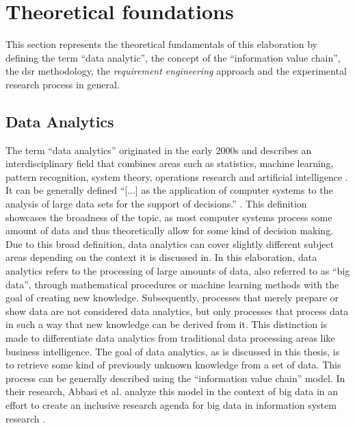 \newpage\section{Theoretical foundations}

This section represents the theoretical fundamentals of this elaboration by defining the term \enquote{data analytic}, the concept of the \enquote{information value chain}, the \ac{dsr} methodology, the \textit{requirement engineering} approach and the experimental research process in general.


\subsection{Data Analytics}

The term \enquote{data analytics} originated in the early 2000s and describes an interdisciplinary field that combines areas such as statistics, machine learning, pattern recognition, system theory, operations research and artificial intelligence \parencite{Runkler.2020}. It can be generally defined \enquote{[...] as the application of computer systems to the analysis of large data sets for the support of decisions.} \parencite{Runkler.2020}. This definition showcases the broadness of the topic, as most computer systems process some amount of data and thus theoretically allow for some kind of decision making. Due to this broad definition, data analytics can cover slightly different subject areas depending on the context it is discussed in. In this elaboration, data analytics refers to the processing of large amounts of data, also referred  to as \enquote{big data}, through mathematical procedures or machine learning methods with the goal of creating new knowledge. Subsequently, processes that merely prepare or show data are not considered data analytics, but only processes that process data in such a way that new knowledge can be derived from it. This distinction is made to differentiate data analytics from traditional data processing areas like business intelligence. The goal of data analytics, as is discussed in this thesis, is to retrieve some kind of previously unknown knowledge from a set of data. This process can be generally described using the \enquote{information value chain} model. In their research, Abbasi et al. analyze this model in the context of big data in an effort to create an inclusive research agenda for big data in information system research \parencite{Abbasi.2016}.

